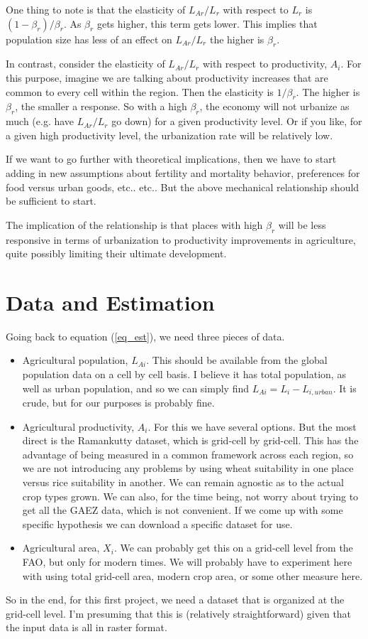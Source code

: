 \documentclass[10pt]{article}
\begin{document}
One thing to note is that the elasticity of $L_{Ar}/L_r$ with respect to $L_r$ is $(1-\beta_r)/\beta_r$. As $\beta_r$ gets higher, this term gets lower. This implies that population size has less of an effect on $L_{Ar}/L_r$ the higher is $\beta_r$.

In contrast, consider the elasticity of $L_{Ar}/L_r$ with respect to productivity, $A_i$. For this purpose, imagine we are talking about productivity increases that are common to every cell within the region. Then the elasticity is $1/\beta_r$. The higher is $\beta_r$, the smaller a response. So with a high $\beta_r$, the economy will not urbanize as much (e.g. have $L_{Ar}/L_r$ go down) for a given productivity level. Or if you like, for a given high productivity level, the urbanization rate will be relatively low.

If we want to go further with theoretical implications, then we have to start adding in new assumptions about fertility and mortality behavior, preferences for food versus urban goods, etc.. etc.. But the above mechanical relationship should be sufficient to start.

The implication of the relationship is that places with high $\beta_r$ will be less responsive in terms of urbanization to productivity improvements in agriculture, quite possibly limiting their ultimate development.

\section{Data and Estimation}
Going back to equation (\ref{eq_est}), we need three pieces of data. 
\begin{itemize}
	\item Agricultural population, $L_{Ai}$. This should be available from the global population data on a cell by cell basis. I believe it has total population, as well as urban population, and so we can simply find $L_{Ai} = L_i - L_{i,urban}$. It is crude, but for our purposes is probably fine.
	\item Agricultural productivity, $A_i$. For this we have several options. But the most direct is the Ramankutty dataset, which is grid-cell by grid-cell. This has the advantage of being measured in a common framework across each region, so we are not introducing any problems by using wheat suitability in one place versus rice suitability in another. We can remain agnostic as to the actual crop types grown. We can also, for the time being, not worry about trying to get all the GAEZ data, which is not convenient. If we come up with some specific hypothesis we can download a specific dataset for use.
	\item Agricultural area, $X_i$. We can probably get this on a grid-cell level from the FAO, but only for modern times. We will probably have to experiment here with using total grid-cell area, modern crop area, or some other measure here.
\end{itemize}
So in the end, for this first project, we need a dataset that is organized at the grid-cell level. I'm presuming that this is (relatively straightforward) given that the input data is all in raster format.
\end{document}

